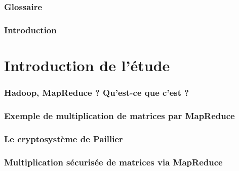 \documentclass[a4paper, 11pt]{article}
\begin{document}
\newpage
\thispagestyle{plain}

\section*{Glossaire}
	

\newpage
\renewcommand{\thepage}{\arabic{page}}
\setcounter{page}{1}

\section{Introduction}



\part{Introduction de l'étude}
\section{Hadoop, MapReduce ? Qu'est-ce que c'est ?}


\section{Exemple de multiplication de matrices par MapReduce}


\section{Le cryptosystème de Paillier}

\section{Multiplication sécurisée de matrices via MapReduce}


\end{document}
